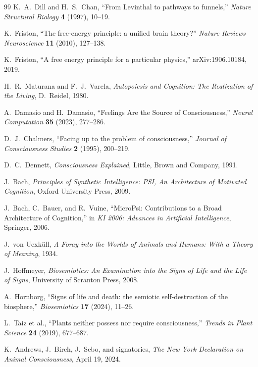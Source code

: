 \documentclass[11pt]{article}
\theoremstyle{remark}
\theoremstyle{plain}
\begin{document}
\begin{thebibliography}{99}
K.\ A.\ Dill and H.\ S.\ Chan,
``From Levinthal to pathways to funnels,''
\emph{Nature Structural Biology} \textbf{4} (1997), 10--19.

K.\ Friston,
``The free-energy principle: a unified brain theory?''
\emph{Nature Reviews Neuroscience} \textbf{11} (2010), 127--138.

K.\ Friston,
``A free energy principle for a particular physics,''
arXiv:1906.10184, 2019.

H.\ R.\ Maturana and F.\ J.\ Varela,
\emph{Autopoiesis and Cognition: The Realization of the Living},
D.\ Reidel, 1980.

A.\ Damasio and H.\ Damasio,
``Feelings Are the Source of Consciousness,''
\emph{Neural Computation} \textbf{35} (2023), 277--286.

D.\ J.\ Chalmers,
``Facing up to the problem of consciousness,''
\emph{Journal of Consciousness Studies} \textbf{2} (1995), 200--219.

D.\ C.\ Dennett,
\emph{Consciousness Explained},
Little, Brown and Company, 1991.

J.\ Bach,
\emph{Principles of Synthetic Intelligence: PSI, An Architecture of Motivated Cognition},
Oxford University Press, 2009.

J.\ Bach, C.\ Bauer, and R.\ Vuine,
``MicroPsi: Contributions to a Broad Architecture of Cognition,''
in \emph{KI 2006: Advances in Artificial Intelligence},
Springer, 2006.

J.\ von Uexk\"ull,
\emph{A Foray into the Worlds of Animals and Humans: With a Theory of Meaning},
1934.

J.\ Hoffmeyer,
\emph{Biosemiotics: An Examination into the Signs of Life and the Life of Signs},
University of Scranton Press, 2008.

A.\ Hornborg,
``Signs of life and death: the semiotic self-destruction of the biosphere,''
\emph{Biosemiotics} \textbf{17} (2024), 11--26.

L.\ Taiz et al.,
``Plants neither possess nor require consciousness,''
\emph{Trends in Plant Science} \textbf{24} (2019), 677--687.

K.\ Andrews, J.\ Birch, J.\ Sebo, and signatories,
\emph{The New York Declaration on Animal Consciousness},
April 19, 2024.


\end{thebibliography}
\end{document}
